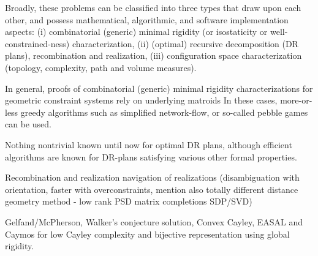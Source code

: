 Broadly, these problems can be classified into three types that draw upon each other, and possess mathematical, algorithmic, 
and software implementation aspects: (i) combinatorial (generic) minimal rigidity (or isostaticity or well-constrained-ness) 
characterization, (ii) (optimal) recursive decomposition (DR plans), recombination and realization, (iii) configuration space 
characterization (topology, complexity, path and volume measures).

In general, proofs of combinatorial (generic) minimal rigidity characterizations for geometric constraint systems rely on 
underlying matroids  In these cases, more-or-less greedy algorithms such as simplified network-flow, 
or so-called pebble games can be used.

Nothing nontrivial known until now for optimal DR plans, although efficient algorithms are known for DR-plans satisfying 
various other formal properties.

Recombination and realization navigation of realizations (disambiguation with orientation, faster with overconstraints, mention 
also totally different distance geometry method - low rank PSD matrix completions SDP/SVD)

Gelfand/McPherson, Walker's conjecture solution, Convex Cayley, EASAL and Caymos for low Cayley complexity and bijective 
representation using global rigidity.
